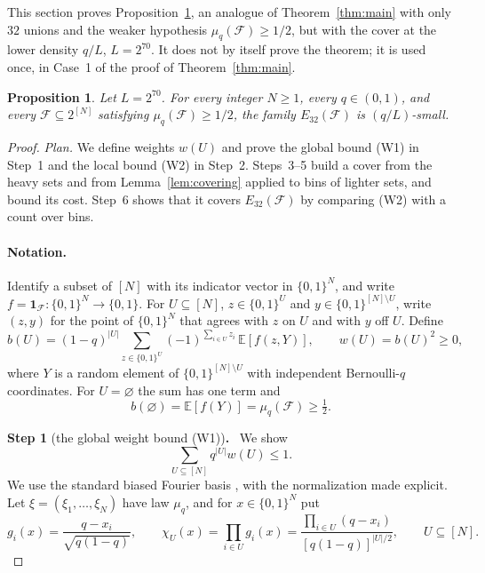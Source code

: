 \documentclass[11pt,letterpaper]{article}
\newtheorem{proposition}[theorem]{Proposition}
\theoremstyle{definition}
\theoremstyle{remark}
\numberwithin{equation}{section}
\newcommand{\step}[2]{\medskip\noindent\textbf{Step #1} (#2)\textbf{.}\ }
\begin{document}
This section proves Proposition~\ref{prop:half-density}, an analogue of
Theorem~\ref{thm:main} with only $32$ unions and the weaker hypothesis
$\mu_q(\mathcal F)\ge1/2$, but with the cover at the lower density
$q/L$, $L=2^{70}$. It does not by itself prove the theorem; it is used
once, in Case~1 of the proof of Theorem~\ref{thm:main}.

\begin{proposition}\label{prop:half-density}
Let $L=2^{70}$. For every integer $N\ge1$, every $q\in(0,1)$, and every
$\mathcal F\subseteq 2^{[N]}$ satisfying $\mu_q(\mathcal F)\ge1/2$,
the family $E_{32}(\mathcal F)$ is $(q/L)$-small.
\end{proposition}

\begin{proof}
\emph{Plan.} We define weights $w(U)$ and prove the global bound (W1) in
Step~1 and the local bound (W2) in Step~2. Steps~3--5 build a cover from
the heavy sets and from Lemma~\ref{lem:covering} applied to bins of lighter
sets, and bound its cost. Step~6 shows that it covers
$E_{32}(\mathcal F)$ by comparing (W2) with a count over bins.

\paragraph{Notation.}
Identify a subset of $[N]$ with its indicator vector in $\{0,1\}^N$, and
write $f=\mathbf 1_{\mathcal F}:\{0,1\}^N\to\{0,1\}$. For
$U\subseteq[N]$, $z\in\{0,1\}^U$ and $y\in\{0,1\}^{[N]\setminus U}$, write
$(z,y)$ for the point of $\{0,1\}^N$ that agrees with $z$ on $U$ and with
$y$ off $U$. Define
\begin{equation}\label{eq:weights-definition}
 b(U)=(1-q)^{|U|}
 \sum_{z\in\{0,1\}^{U}}(-1)^{\sum_{i\in U}z_i}\,
 \mathbb E[f(z,Y)],
 \qquad w(U)=b(U)^2\ge0,
\end{equation}
where $Y$ is a random element of $\{0,1\}^{[N]\setminus U}$ with
independent Bernoulli-$q$ coordinates. For $U=\varnothing$ the sum has
one term and
\begin{equation}\label{eq:b-empty}
b(\varnothing)=\mathbb E[f(Y)]=\mu_q(\mathcal F)\ge\tfrac12 .
\end{equation}

\step{1}{the global weight bound \textup{(W1)}}
We show
\begin{equation}\label{eq:global-weight-bound}
 \sum_{U\subseteq[N]}q^{|U|}w(U)\le1 .
\end{equation}
We use the standard biased Fourier basis
\cite[Section~8.4]{ODonnell14}, with the normalization made explicit.
Let $\xi=(\xi_1,\ldots,\xi_N)$ have law $\mu_q$, and for $x\in\{0,1\}^N$
put
\[
 g_i(x)=\frac{q-x_i}{\sqrt{q(1-q)}},\qquad
 \chi_U(x)=\prod_{i\in U}g_i(x)
 =\frac{\prod_{i\in U}(q-x_i)}{[q(1-q)]^{|U|/2}},
 \qquad U\subseteq[N].
\]


\end{proof}
\end{document}
